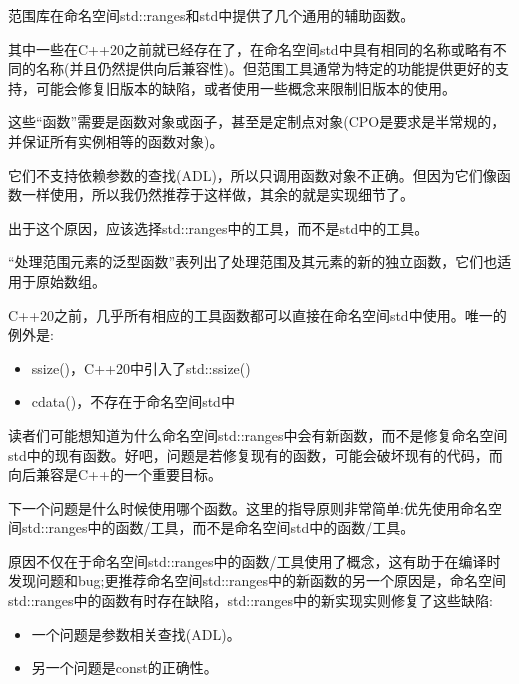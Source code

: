 
范围库在命名空间std::ranges和std中提供了几个通用的辅助函数。

其中一些在C++20之前就已经存在了，在命名空间std中具有相同的名称或略有不同的名称(并且仍然提供向后兼容性)。但范围工具通常为特定的功能提供更好的支持，可能会修复旧版本的缺陷，或者使用一些概念来限制旧版本的使用。

这些“函数”需要是函数对象或函子，甚至是定制点对象(CPO是要求是半常规的，并保证所有实例相等的函数对象)。

它们不支持依赖参数的查找(ADL)，所以只调用函数对象不正确。但因为它们像函数一样使用，所以我仍然推荐于这样做，其余的就是实现细节了。

出于这个原因，应该选择std::ranges中的工具，而不是std中的工具。


“处理范围元素的泛型函数”表列出了处理范围及其元素的新的独立函数，它们也适用于原始数组。

C++20之前，几乎所有相应的工具函数都可以直接在命名空间std中使用。唯一的例外是:

\begin{itemize}
\item
ssize()，C++20中引入了std::ssize()

\item
cdata()，不存在于命名空间std中
\end{itemize}

读者们可能想知道为什么命名空间std::ranges中会有新函数，而不是修复命名空间std中的现有函数。好吧，问题是若修复现有的函数，可能会破坏现有的代码，而向后兼容是C++的一个重要目标。

下一个问题是什么时候使用哪个函数。这里的指导原则非常简单:优先使用命名空间std::ranges中的函数/工具，而不是命名空间std中的函数/工具。

原因不仅在于命名空间std::ranges中的函数/工具使用了概念，这有助于在编译时发现问题和bug;更推荐命名空间std::ranges中的新函数的另一个原因是，命名空间std::ranges中的函数有时存在缺陷，std::ranges中的新实现实则修复了这些缺陷:

\begin{itemize}
\item
一个问题是参数相关查找(ADL)。

\item
另一个问题是const的正确性。
\end{itemize}

